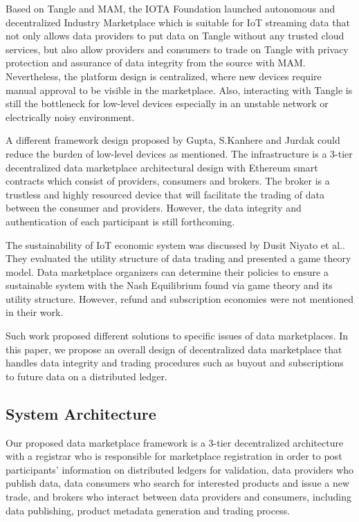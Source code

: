 \documentclass[journal,article,applsci,submit,moreauthors,pdftex]{Definitions/mdpi}
\begin{document}
Based on Tangle and MAM, the IOTA Foundation launched autonomous and decentralized Industry Marketplace\cite{IOTAIdustryMarketplace} which is suitable for IoT streaming data that not only allows data providers to put data on Tangle without any trusted cloud services, but also allow providers and consumers to trade on Tangle with privacy protection and assurance of data integrity from the source with MAM. Nevertheless, the platform design is centralized, where new devices require manual approval to be visible in the marketplace. Also, interacting with Tangle is still the bottleneck for low-level devices especially in an unstable network or electrically noisy environment.

A different framework design proposed by Gupta, S.Kanhere and Jurdak\cite{3tierDataMarket} could reduce the burden of low-level devices as mentioned. The infrastructure is a 3-tier decentralized data marketplace architectural design with Ethereum smart contracts which consist of providers, consumers and brokers. The broker is a trustless and highly resourced device that will facilitate the trading of data between the consumer and providers. However, the data integrity and authentication of each participant is still forthcoming.

The sustainability of IoT economic system was discussed by Dusit Niyato et al.\cite{UtilityStruct}. They evaluated the utility structure of data trading and presented a game theory model.  Data marketplace organizers can determine their policies to ensure a sustainable system with the Nash Equilibrium found via game theory and its utility structure. However, refund and subscription economies were not mentioned in their work.

Such work proposed different solutions to specific issues of data marketplaces. In this paper, we propose an overall design of decentralized data marketplace that handles data integrity and trading procedures such as buyout and subscriptions to future data on a distributed ledger.

\subsection{System Architecture}
Our proposed data marketplace framework is a 3-tier decentralized architecture with a registrar who is responsible for marketplace registration in order to post participants' information on distributed ledgers for validation, data providers who publish data, data consumers who search for interested products and issue a new trade, and brokers who interact between data providers and consumers, including data publishing, product metadata generation and trading process.
\end{document}
